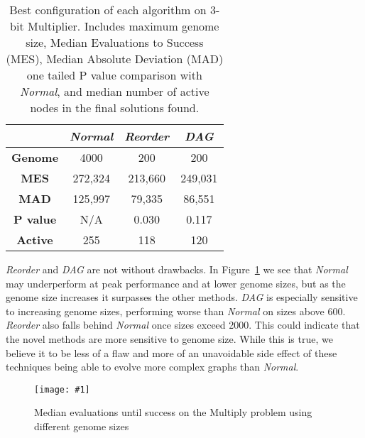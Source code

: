 \documentclass{sig-alternate}
\newcommand{\includegraphicsfit}[1]
{\texttt{[image: \#1]}}
\begin{document}
\begin{table}
	\centering
	\begin{tabular}{|c|c|c|c|}
	  \hline
& \textbf{\emph{Normal}} & \textbf{\emph{Reorder}} & \textbf{\emph{DAG}} \\ \hline
\textbf{Genome} & 4000   & 200     & 200 \\ \hline
  \textbf{MES} & 272,324 & 213,660 & 249,031 \\ \hline
  \textbf{MAD} & 125,997 & 79,335  & 86,551 \\ \hline
  \textbf{P value} & N/A & 0.030   & 0.117 \\ \hline
  \textbf{Active} & 255  & 118     & 120 \\ \hline

	\end{tabular}
	\caption{Best configuration of each algorithm on 3-bit Multiplier.
	Includes maximum genome size, Median Evaluations to Success (MES), Median Absolute Deviation (MAD)
	one tailed P value comparison with \emph{Normal}, and median number of active
	nodes in the final solutions found.}
	\label{table-multiply}
\end{table}

\emph{Reorder} and \emph{DAG} are not without drawbacks.  In Figure~\ref{fig-multiply} we see that
\emph{Normal} may underperform at peak performance and at lower genome sizes, but
as the genome size increases it surpasses the other methods.  \emph{DAG} is especially
sensitive to increasing genome sizes, performing worse than \emph{Normal} on sizes above 600.
\emph{Reorder} also falls behind \emph{Normal} once sizes exceed 2000.  This
could indicate that the novel methods are more sensitive to genome size.
While this is true, we believe it to be less of a flaw and more of an unavoidable side
effect of these techniques being able to evolve more complex graphs than \emph{Normal}.

\begin{figure}
  \centering
  \includegraphicsfit{multiply}
  \caption{Median evaluations until success on the Multiply problem using different genome sizes} 
  \label{fig-multiply}
\end{figure}
\end{document}
